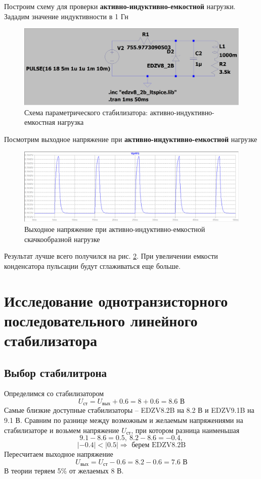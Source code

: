 \documentclass[a4paper, 12pt]{article}
\begin{document}
    \noindent Построим схему для проверки \textbf{активно-индуктивно-емкостной} нагрузки. Зададим
    значение индуктивности в 1 Гн
    \begin{figure}[H]
        \centering
        \includegraphics[scale=0.22]{1task_scheme_ALC.png}
        \captionsetup{skip=0pt}
        \caption{Схема параметрического стабилизатора: активно-индуктивно-емкостная нагрузка}
        \label{fig:1task_scheme_ALC}
    \end{figure}
    \noindent Посмотрим выходное напряжение при \textbf{активно-индуктивно-емкостной} нагрузке
    \begin{figure}[H]
        \centering
        \includegraphics[scale=0.46]{1task_rect_ALC.png}
        \captionsetup{skip=0pt}
        \caption{Выходное напряжение при активно-индуктивно-емкостной скачкообразной нагрузке}
        \label{fig:1task_rect_ALC}
    \end{figure}
    \noindent Результат лучше всего получился на рис. \ref{fig:1task_rect_ALC}. При увеличении
    емкости конденсатора пульсации будут сглаживаться еще больше.


    \section{Исследование однотранзисторного последовательного линейного стабилизатора}
    \subsection{Выбор стабилитрона}
    Определимся со стабилизатором
    $$
    U_{\text{ст}}=U_{\text{вых}}+0.6=8+0.6=8.6\text{ В}
    $$
    Самые близкие доступные стабилизаторы -- EDZV8.2B на 8.2 В и EDZV9.1B на 9.1 В.
    Сравним по разнице между возможным и желаемым напряжениями на стабилизаторе и возьмем
    напряжение $U_{\text{ст}}$, при котором разница наименьшая
    $$
    9.1-8.6=0.5,\ 8.2-8.6=-0.4,
    $$
    $$
    |-0.4|<|0.5|\Rightarrow\text{ берем EDZV8.2B}
    $$
    Пересчитаем выходное напряжение
    $$
    U_{\text{вых}}=U_{\text{ст}}-0.6=8.2-0.6=7.6\text{ В}
    $$
    В теории теряем 5\% от желаемых 8 В.
    
\end{document}
